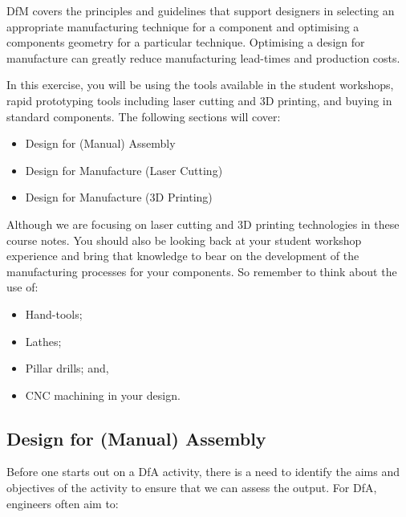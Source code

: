 \acf{DfM} covers the principles and guidelines that support designers in selecting an appropriate manufacturing technique for a component and optimising a components geometry for a particular technique. Optimising a design for manufacture can greatly reduce manufacturing lead-times and production costs. 

In this exercise, you will be using the tools available in the student workshops, rapid prototyping tools including laser cutting and 3D printing, and buying in standard components. The following sections will cover:

\begin{itemize}
  \item Design for (Manual) Assembly
  \item Design for Manufacture (Laser Cutting)
  \item Design for Manufacture (3D Printing)
\end{itemize}

Although we are focusing on laser cutting and 3D printing technologies in these course notes. You should also be looking back at your student workshop experience and bring that knowledge to bear on the development of the manufacturing processes for your components. So remember to think about the use of:

\begin{itemize}
  \item Hand-tools;
  \item Lathes;
  \item Pillar drills; and,
  \item CNC machining in your design.
\end{itemize}

\subsection{Design for (Manual) Assembly}

Before one starts out on a DfA activity, there is a need to identify the aims and objectives of the activity to ensure that we can assess the output. For DfA, engineers often aim to:

